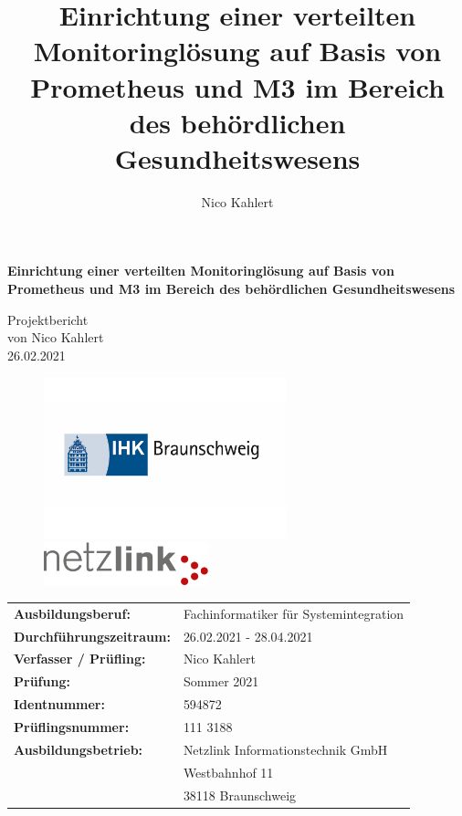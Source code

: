 \documentclass[11pt,a4paper]{article}
\author{Nico Kahlert}
\title{
  Einrichtung einer verteilten Monitoringlösung auf Basis von Prometheus und M3 
  im Bereich des behördlichen Gesundheitswesens
}
\begin{document}
\renewcommand{\familydefault}{\sfdefault}
\selectfont

\begin{titlepage}
  \vspace*{1cm}
  \begin{center}
    {\bfseries\Huge
      Einrichtung einer verteilten Monitoringlösung auf Basis von Prometheus und M3
      im Bereich des behördlichen Gesundheitswesens
    }
    \Large
    \vspace{1cm}

    Projektbericht\\
    von Nico Kahlert\\
    26.02.2021

    \begin{center}

      \begin{figure}[ht]
        \centering
        \includegraphics[width=7cm]{assets/ihk-logo.png}\\
        \includegraphics[height=1.25cm]{assets/netzlink.png}
      \end{figure}

    \end{center}
  \end{center}
  \begin{Large}
    \begin{tabular}{@{}ll}
      \textbf{Ausbildungsberuf:}      & Fachinformatiker für Systemintegration \\
      \textbf{Durchführungszeitraum:} & 26.02.2021 - 28.04.2021                \\
      \textbf{Verfasser / Prüfling:}  & Nico Kahlert                           \\
      \textbf{Prüfung:}               & Sommer 2021                            \\
      \textbf{Identnummer:}           & 594872                                 \\
      \textbf{Prüflingsnummer:}       & 111 3188                             \\
      \textbf{Ausbildungsbetrieb:}    & Netzlink Informationstechnik GmbH      \\
                                      & Westbahnhof 11                         \\
                                      & 38118 Braunschweig
    \end{tabular}
  \end{Large}
\end{titlepage}
\end{document}
